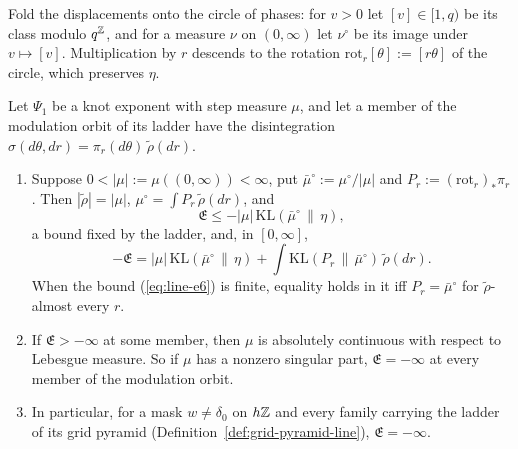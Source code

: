 Fold the displacements onto the circle of phases: for $v > 0$ let $[v] \in [1,q)$ be its class
modulo $q^{\mathbb{Z}}$, and for a measure $\nu$ on $(0,\infty)$ let $\nu^\circ$ be its image under
$v \mapsto [v]$. Multiplication by $r$ descends to the rotation $\mathrm{rot}_r[\theta] := [r\theta]$
of the circle, which preserves $\eta$.

\begin{proposition}
\label{prop:phase-entropy-ladder-bound}

Let $\Psi_1$ be a knot exponent with step measure $\mu$, and let a member of the modulation orbit of
its ladder have the disintegration $\sigma(d\theta,dr) = \pi_r(d\theta)\,\tilde\rho(dr)$.
\begin{enumerate}
\item Suppose $0 < |\mu| := \mu((0,\infty)) < \infty$, put $\bar\mu^\circ := \mu^\circ/|\mu|$ and
$P_r := (\mathrm{rot}_r)_*\pi_r$. Then $|\tilde\rho| = |\mu|$, $\mu^\circ = \int P_r\,\tilde\rho(dr)$,
and
\begin{equation}\label{eq:line-e6}
  \mathfrak{E} \le -|\mu|\,\mathrm{KL}(\bar\mu^\circ \,\|\, \eta),
\end{equation}
a bound fixed by the ladder, and, in $[0,\infty]$,
\[
  -\mathfrak{E} = |\mu|\,\mathrm{KL}(\bar\mu^\circ \,\|\, \eta)
  + \int\mathrm{KL}(P_r \,\|\, \bar\mu^\circ)\,\tilde\rho(dr).
\]
When the bound (\ref{eq:line-e6}) is finite, equality holds in it iff $P_r = \bar\mu^\circ$ for
$\tilde\rho$-almost every $r$.
\item If $\mathfrak{E} > -\infty$ at some member, then $\mu$ is absolutely continuous with respect
to Lebesgue measure. So if $\mu$ has a nonzero singular part, $\mathfrak{E} = -\infty$ at every
member of the modulation orbit.
\item In particular, for a mask $w \ne \delta_0$ on $h\mathbb{Z}$ and every family carrying the ladder of
its grid pyramid (Definition~\ref{def:grid-pyramid-line}), $\mathfrak{E} = -\infty$.
\end{enumerate}
\end{proposition}

